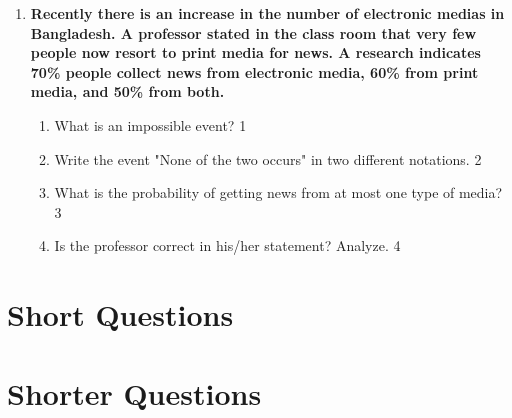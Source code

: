 \documentclass[a4paper,oneside, margin=1.4in]{book}
\begin{document}
\begin{enumerate}
 \item
	  \textbf{Recently there is an increase in the number of electronic medias in Bangladesh. A professor stated in the class room that very few people now resort to print media for news. A research indicates 70\% people collect news from electronic media, 60\% from print media, and 50\% from both.} 
  
  \begin{enumerate}
    \item
	What is an impossible event? \hfill 1
    \item
	Write the event "None of the two occurs" in two different notations. \hfill 2
    \item  
	What is the probability of getting news from at most one type of media? \hfill 3
    \item
	Is the professor correct in his/her statement? Analyze. \hfill 4
  \end{enumerate}
  


  \end{enumerate}

\section{Short Questions}

\section{Shorter Questions}
\end{document}
